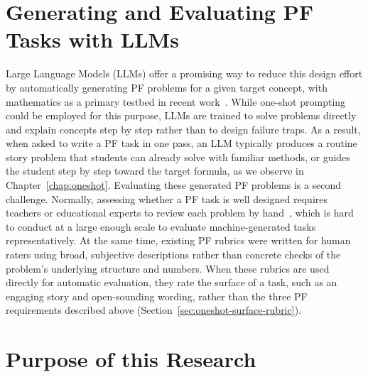 \section{Generating and Evaluating PF Tasks with LLMs}
\label{sec:intro-limitations}

Large Language Models (LLMs) offer a promising way to reduce this design effort by automatically generating PF problems for a given target concept, with mathematics as a primary testbed in recent work~\cite{rahimi2025productivemath,rahimi2025,puech2025}. While one-shot prompting could be employed for this purpose, LLMs are trained to solve problems directly and explain concepts step by step rather than to design failure traps. As a result, when asked to write a PF task in one pass, an LLM typically produces a routine story problem that students can already solve with familiar methods, or guides the student step by step toward the target formula, as we observe in Chapter~\ref{chap:oneshot}. Evaluating these generated PF problems is a second challenge. Normally, assessing whether a PF task is well designed requires teachers or educational experts to review each problem by hand~\cite{rahimi2025}, which is hard to conduct at a large enough scale to evaluate machine-generated tasks representatively. At the same time, existing PF rubrics were written for human raters using broad, subjective descriptions rather than concrete checks of the problem's underlying structure and numbers. When these rubrics are used directly for automatic evaluation, they rate the surface of a task, such as an engaging story and open-sounding wording, rather than the three PF requirements described above (Section~\ref{sec:oneshot-surface-rubric}).


\section{Purpose of this Research}
\label{sec:intro-goals}

